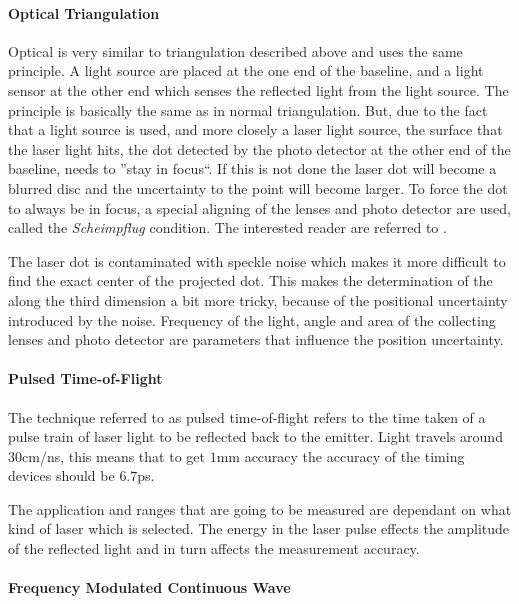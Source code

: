\paragraph{Optical Triangulation}
Optical is very similar to triangulation described above and uses the same principle.
A light source are placed at the one end of the
baseline, and a light sensor at the other end which senses the reflected light from the
light source. The principle is basically the same as in normal triangulation. But, due to
the fact that a light source is used, and more closely a laser light source, the surface
that the laser light hits, the dot detected by the photo detector at the other end of the
baseline, needs to ''stay in focus``. If this is not done the laser dot will become a
blurred disc and the uncertainty to the point will become larger. To force the dot to
always be in focus, a special aligning of the lenses and photo detector are used, called 
the \emph{Scheimpflug} condition. The interested reader are referred to
\cite{laser-ranging-critical-review}.

The laser dot is contaminated with speckle noise which makes it more difficult to find the
exact center of the projected dot. This makes the determination of the along the third
dimension a bit more tricky, because of the positional uncertainty introduced by the
noise. Frequency of the light, angle and area of the collecting lenses and photo detector
are parameters that influence the position uncertainty. 


\paragraph{Pulsed Time-of-Flight}
The technique referred to as pulsed time-of-flight refers to the time taken of a pulse
train of laser light to be reflected back to the emitter. Light travels around $30$cm/ns,
this means that to get $1$mm accuracy the accuracy of the timing devices should be
$6.7$ps.

The application and ranges that are going to be measured are dependant on what kind of
laser which is selected. The energy in the laser pulse effects the amplitude of the
reflected light and in turn affects the measurement accuracy.



\paragraph{Frequency Modulated Continuous Wave}




